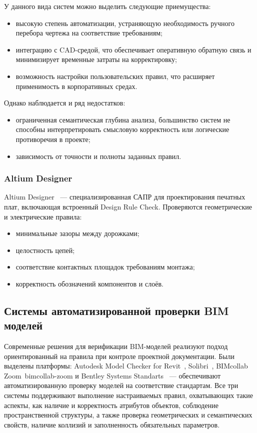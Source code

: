 У данного вида систем можно выделить следующие приемущества:
\begin{itemize}
    \item высокую степень автоматизации, устраняющую необходимость ручного перебора чертежа на соответствие требованиям;
    \item интеграцию с CAD-средой, что обеспечивает оперативную обратную связь и минимизирует временные затраты на корректировку;
    \item возможность настройки пользовательских правил, что расширяет применимость в корпоративных средах.
\end{itemize}
Однако наблюдается и ряд недостатков:
\begin{itemize}
    \item ограниченная семантическая глубина анализа, большинство систем не способны интерпретировать смысловую корректность или логические противоречия в проекте;
    \item зависимость от точности и полноты заданных правил.
\end{itemize}

\subsubsection{Altium Designer}

Altium Designer~\cite{altium-designer} --- специализированная САПР для проектирования печатных плат,
включающая встроенный Design Rule Check.
Проверяются геометрические и электрические правила:
\begin{itemize}
    \item минимальные зазоры между дорожками;
    \item целостность цепей;
    \item соответствие контактных площадок требованиям монтажа;
    \item корректность обозначений компонентов и слоёв.
\end{itemize}

\subsection{Системы автоматизированной проверки BIM моделей}

Современные решения для верификации BIM-моделей реализуют подход ориентированный на правила при
контроле проектной документации.
Были выделены платформы: Autodesk Model Checker for Revit~\cite{autodesk-revit-model-checker}, Solibri~\cite{solibri}, BIMcollab Zoom~{bimcollab-zoom} и Bentley Systems Standarts~\cite{bentley-standarts} ---
обеспечивают автоматизированную проверку моделей на соответствие стандартам.
Все три системы поддерживают выполнение настраиваемых правил,
охватывающих такие аспекты, как наличие и корректность атрибутов объектов, соблюдение пространственной структуры, а также
проверка геометрических и семантических свойств, наличие коллизий и заполненность обязательных параметров.

